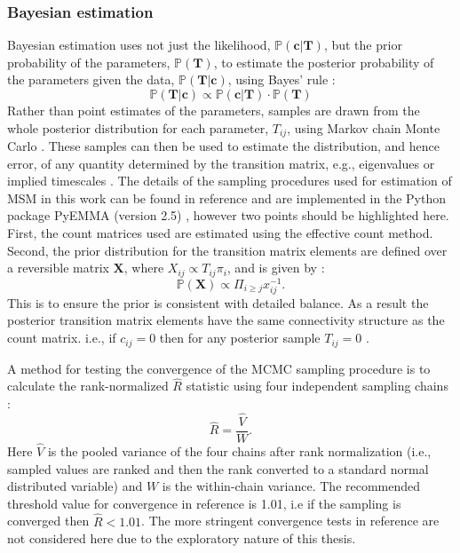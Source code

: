\subsubsection{Bayesian estimation}\label{sec:theory_bayes}
Bayesian estimation uses not just the likelihood, $\mathbb{P}(\mathbf{c}|\mathbf{T})$, but the prior probability of the parameters, $\mathbb{P}(\mathbf{T})$, to estimate the posterior probability of the parameters given the data, $\mathbb{P}(\mathbf{T}|\mathbf{c})$, using Bayes' rule \cite{gelmanBayesianDataAnalysis2014}: 
\begin{equation}
    \mathbb{P}(\mathbf{T}|\mathbf{c}) \propto \mathbb{P}(\mathbf{c}|\mathbf{T})\cdot\mathbb{P}(\mathbf{T})
\end{equation}
Rather than point estimates of the parameters, samples are drawn from the whole posterior distribution for each parameter, $T_{ij}$, using Markov chain Monte Carlo \cite{gelmanBayesianDataAnalysis2014}. These samples can then be used to estimate the distribution, and hence error, of any quantity determined by the transition matrix, e.g., eigenvalues or implied timescales \cite{gelmanBayesianDataAnalysis2014}. The details of the sampling procedures used for estimation of MSM in this work can be found in reference \cite{trendelkamp-schroerEstimationUncertaintyReversible2015b} and are implemented in the Python package PyEMMA (version 2.5) \cite{schererPyEMMASoftwarePackage2015a}, however two points should be highlighted here. First, the count matrices used are estimated using the effective count method. Second, the prior distribution for the transition matrix elements are defined over a reversible matrix $\mathbf{X}$, where $X_{ij}\propto T_{ij}\pi_{i}$, and is given by \cite{trendelkamp-schroerEstimationUncertaintyReversible2015b}: 
\begin{equation}\label{eqn:theory_rev_prior}
    \mathbb{P}(\mathbf{X}) \propto \Pi_{i \ge j}x_{ij}^{-1}. 
\end{equation}
This is to ensure the prior is consistent with detailed balance. As a result the posterior transition matrix elements have the same connectivity structure as the count matrix. i.e., if $c_{ij}=0$ then for any posterior sample $T_{ij}=0$ \cite{trendelkamp-schroerEstimationUncertaintyReversible2015b}. 

A method for testing the convergence of the MCMC sampling procedure is to calculate the rank-normalized $\hat{R}$ statistic using four independent sampling chains \cite{vehtariRanknormalizationFoldingLocalization2020}:
\begin{equation}
    \hat{R} = \frac{\hat{V}}{W}.
\end{equation}
Here $\hat{V}$ is the pooled variance of the four chains after rank normalization (i.e., sampled values are ranked and then the rank converted to a standard normal distributed variable) and $W$ is the within-chain variance. The recommended threshold value for convergence in reference \cite{vehtariRanknormalizationFoldingLocalization2020} is \num{1.01}, i.e if the sampling is converged then $\widehat{R} < 1.01$. The more stringent convergence tests in reference \cite{vehtariRanknormalizationFoldingLocalization2020} are not considered here due to the exploratory nature of this thesis.   

